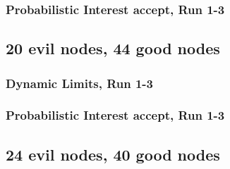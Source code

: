 \documentclass[onecolumn]{IEEEtran}
\begin{document}
\begin{minipage}[b]{\textwidth}

\end{minipage}

\clearpage

\subsubsection{Probabilistic Interest accept, Run 1-3}

\begin{minipage}[b]{\textwidth}

\end{minipage}

\clearpage
\subsection{\textbf{20 evil nodes}, 44 good nodes}

\subsubsection{Dynamic Limits, Run 1-3}

\begin{minipage}[b]{\textwidth}

\end{minipage}

\clearpage

\subsubsection{Probabilistic Interest accept, Run 1-3}

\begin{minipage}[b]{\textwidth}

\end{minipage}

\clearpage
\subsection{\textbf{24 evil nodes}, 40 good nodes}
\end{document}
